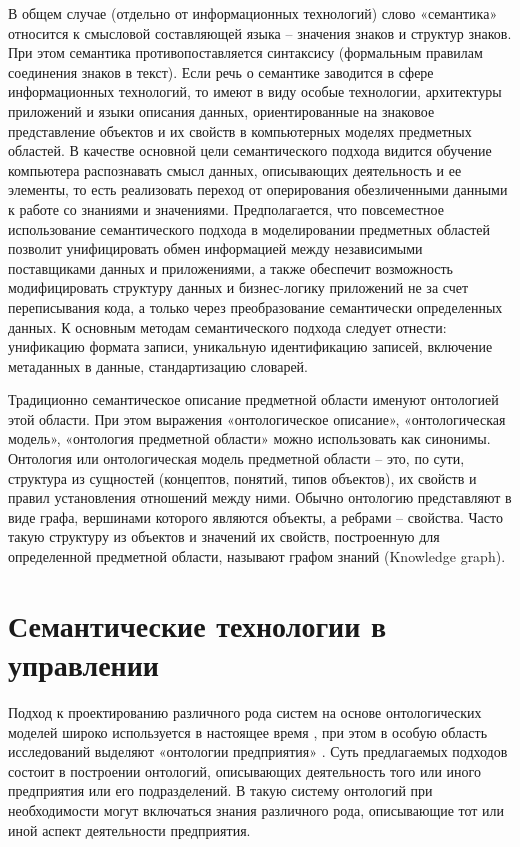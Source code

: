 В общем случае (отдельно от информационных технологий) слово «семантика» относится к смысловой составляющей языка – значения знаков и структур знаков. При этом семантика противопоставляется синтаксису (формальным правилам соединения знаков в текст). Если речь о семантике заводится в сфере информационных технологий, то имеют в виду особые технологии, архитектуры приложений и языки описания данных, ориентированные на знаковое представление объектов и их свойств в компьютерных моделях предметных областей. В качестве основной цели семантического подхода видится обучение компьютера распознавать смысл данных, описывающих деятельность и ее элементы, то есть реализовать переход от оперирования обезличенными данными к работе со знаниями и значениями. Предполагается, что повсеместное использование семантического подхода в моделировании предметных областей позволит унифицировать обмен информацией между независимыми поставщиками данных и приложениями, а также обеспечит возможность модифицировать структуру данных и бизнес-логику приложений не за счет переписывания кода, а только через преобразование семантически определенных данных. К основным методам семантического подхода следует отнести: унификацию формата записи, уникальную идентификацию записей, включение метаданных в данные, стандартизацию словарей.

Традиционно семантическое описание предметной области именуют онтологией этой области. При этом выражения «онтологическое описание», «онтологическая модель», «онтология предметной области» можно использовать как синонимы. Онтология или онтологическая модель предметной области – это, по сути, структура из сущностей (концептов, понятий, типов объектов), их свойств и правил установления отношений между ними. Обычно онтологию представляют в виде графа, вершинами которого являются объекты, а ребрами – свойства. Часто такую структуру из объектов и значений их свойств, построенную для определенной предметной области, называют графом знаний (Knowledge graph).

\section{Семантические технологии в управлении}

Подход к проектированию различного рода систем на основе онтологических моделей широко используется в настоящее время \cite{Боргест2010}, при этом в особую область исследований выделяют «онтологии предприятия» \cite{Шведин2010}. Суть предлагаемых подходов состоит в построении онтологий, описывающих деятельность того или иного предприятия или его подразделений. В такую систему онтологий при необходимости могут включаться знания различного рода, описывающие тот или иной аспект деятельности предприятия.

